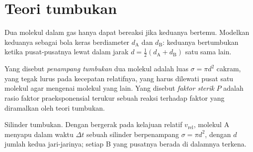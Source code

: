 \section{Teori tumbukan}

Dua molekul dalam gas hanya dapat bereaksi jika keduanya bertemu. Modelkan
keduanya sebagai bola keras berdiameter $d_{\mathrm A}$ dan $d_{\mathrm B}$: keduanya
bertumbukan ketika pusat-pusatnya lewat dalam jarak $d =
\frac12(d_{\mathrm A} + d_{\mathrm B})$ satu sama lain.

\begin{definition}\label{def:b3:rate-theories:collision}
Yang disebut \emph{penampang tumbukan} dua molekul
adalah luas $\sigma = \pi d^2$ cakram, yang tegak lurus pada kecepatan
relatifnya, yang harus dilewati pusat satu molekul agar mengenai molekul yang
lain. Yang disebut \emph{faktor sterik} $P$ adalah rasio
faktor praeksponensial terukur sebuah reaksi terhadap faktor yang diramalkan
oleh teori tumbukan.
\end{definition}

\begin{omfigure}

{\small Silinder tumbukan. Dengan bergerak pada kelajuan relatif $v_{\mathrm{rel}}$,
molekul A menyapu dalam waktu $\Delta t$ sebuah silinder berpenampang
$\sigma = \pi d^2$, dengan $d$ jumlah kedua jari-jarinya; setiap B yang pusatnya
berada di dalamnya terkena.}
\end{omfigure}

